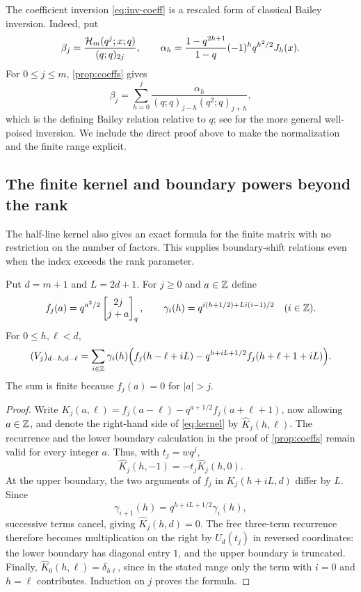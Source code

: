 The coefficient inversion \eqref{eq:inv-coeff} is a rescaled form of classical Bailey inversion. Indeed, put
\[
\beta_j=\frac{\mathcal{H}_m(q^j;x;q)}{(q;q)_{2j}},\qquad \alpha_h=\frac{1-q^{2h+1}}{1-q}(-1)^hq^{h^2/2}J_h(x).
\]
For $0\le j\le m$, \cref{prop:coeffs} gives
\[
\beta_j=\sum_{h=0}^j\frac{\alpha_h}{(q;q)_{j-h}(q^2;q)_{j+h}},
\]
which is the defining Bailey relation relative to $q$; see \cite[Lemma~1]{MZ10} for the more general well-poised inversion. We include the direct proof above to make the normalization and the finite range explicit.

\subsection{The finite kernel and boundary powers beyond the rank}
The half-line kernel also gives an exact formula for the finite matrix with no restriction on the number of factors. This supplies boundary-shift relations even when the index exceeds the rank parameter.

\begin{proposition}\label{prop:kernel}
Put $d=m+1$ and $L=2d+1$. For $j\ge0$ and $a\in\mathbb{Z}$ define
\[
f_j(a)=q^{a^2/2}\begin{bmatrix}2j\\j+a\end{bmatrix}_q,\qquad \gamma_i(h)=q^{i(h+1/2)+Li(i-1)/2}\quad(i\in\mathbb{Z}).
\]
For $0\le h,\ell<d$,
\begin{equation}\label{eq:kernel}
(V_j)_{d-h,d-\ell}=\sum_{i\in\mathbb{Z}}\gamma_i(h)\Bigl(f_j(h-\ell+iL)-q^{h+iL+1/2}f_j(h+\ell+1+iL)\Bigr).
\end{equation}
The sum is finite because $f_j(a)=0$ for $|a|>j$.
\end{proposition}

\begin{proof}
Write $K_j(a,\ell)=f_j(a-\ell)-q^{a+1/2}f_j(a+\ell+1)$, now allowing $a\in\mathbb{Z}$, and denote the right-hand side of \eqref{eq:kernel} by $\widehat K_j(h,\ell)$. The recurrence and the lower boundary calculation in the proof of \cref{prop:coeffs} remain valid for every integer $a$. Thus, with $t_j=wq^j$,
\[
\widehat K_j(h,-1)=-t_j\widehat K_j(h,0).
\]
At the upper boundary, the two arguments of $f_j$ in $K_j(h+iL,d)$ differ by $L$. Since
\[
\gamma_{i+1}(h)=q^{h+iL+1/2}\gamma_i(h),
\]
successive terms cancel, giving $\widehat K_j(h,d)=0$. The free three-term recurrence therefore becomes multiplication on the right by $U_d(t_j)$ in reversed coordinates: the lower boundary has diagonal entry $1$, and the upper boundary is truncated. Finally, $\widehat K_0(h,\ell)=\delta_{h\ell}$, since in the stated range only the term with $i=0$ and $h=\ell$ contributes. Induction on $j$ proves the formula.
\end{proof}

